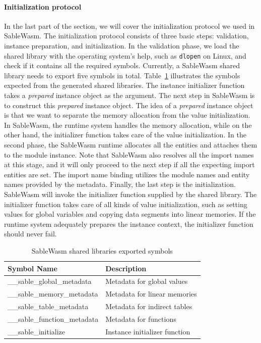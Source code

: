 \paragraph{Initialization protocol}
In the last part of the section, we will cover the initialization protocol we
used in SableWasm. The initialization protocol consists of three basic steps:
validation, instance preparation, and initialization.
In the validation phase, we load the shared library with the operating system's
help, such as \texttt{dlopen} on Linux, and check if it contains all the
required symbols. Currently, a SableWasm shared library needs to export five
symbols in total. Table~\ref{tbl:sablewasm-runtime-export-syms} illustrates the
symbols expected from the generated shared libraries. The instance initializer
function takes a \emph{prepared} instance object as the argument. The next step
in SableWasm is to construct this \emph{prepared} instance object. The idea of
a \emph{prepared} instance object is that we want to separate the memory
allocation from the value initialization. In SableWasm, the runtime system
handles the memory allocation, while on the other hand, the initializer function
takes care of the value initialization. In the second phase, the SableWasm
runtime allocates all the entities and attaches them to the module instance.
Note that SableWasm also resolves all the import names at this stage, and it
will only proceed to the next step if all the expecting import entities are set.
The import name binding utilizes the module names and entity names provided by
the metadata. Finally, the last step is the initialization. SableWasm will
invoke the initializer function supplied by the shared library. The initializer
function takes care of all kinds of value initialization, such as setting values
for global variables and copying data segments into linear memories. If the
runtime system adequately prepares the instance context, the initializer
function should never fail.

\begin{table}[h]
    \centering
    \begin{tabular}{|l|l|}
        \hline
        \textbf{Symbol Name}          & \textbf{Description}          \\ \hline
        \_\_sable\_global\_metadata   & Metadata for global values    \\ \hline
        \_\_sable\_memory\_metadata   & Metadata for linear memories  \\ \hline
        \_\_sable\_table\_metadata    & Metadata for indirect tables  \\ \hline
        \_\_sable\_function\_metadata & Metadata for functions        \\ \hline
        \_\_sable\_initialize         & Instance initializer function \\ \hline
    \end{tabular}
    \caption{SableWasm shared libraries exported symbols}
    \label{tbl:sablewasm-runtime-export-syms}
\end{table}